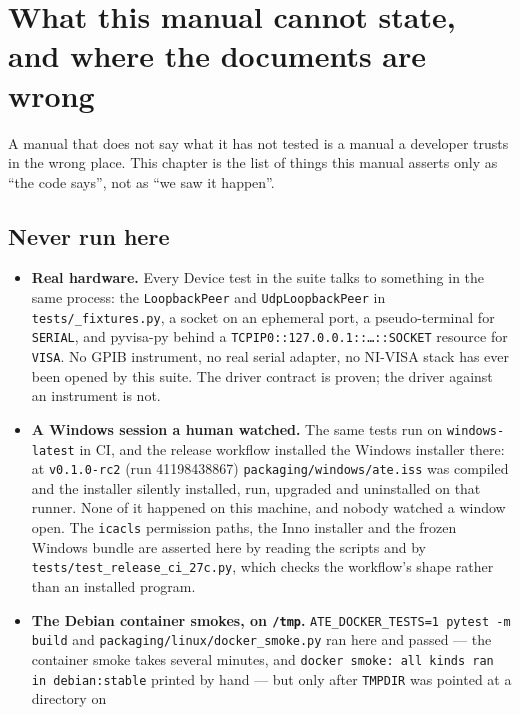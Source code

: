 \chapter{What this manual cannot state, and where the documents are wrong}\label{ch:unproven}

A manual that does not say what it has not tested is a manual a developer trusts in the wrong place.
This chapter is the list of things this manual asserts only as ``the code says'', not as ``we saw it
happen''.

\section{Never run here}

\begin{itemize}
  \item \textbf{Real hardware.} Every Device test in the suite talks to something in the same
    process: the \texttt{LoopbackPeer} and \texttt{UdpLoopbackPeer} in \texttt{tests/\_fixtures.py},
    a socket on an ephemeral port, a pseudo-terminal for \texttt{SERIAL}, and pyvisa-py behind a
    \texttt{TCPIP0::127.0.0.1::\dots::SOCKET} resource for \texttt{VISA}. No GPIB instrument, no real
    serial adapter, no NI-VISA stack has ever been opened by this suite. The driver contract is
    proven; the driver against an instrument is not.
  \item \textbf{A Windows session a human watched.} The same tests run on \texttt{windows-latest} in
    CI, and the release workflow installed the Windows installer there: at \texttt{v0.1.0-rc2} (run
    41198438867) \texttt{packaging/\allowbreak{}windows/\allowbreak{}ate.iss} was compiled and the installer
    silently installed, run, upgraded and uninstalled on that runner. None of it happened on this
    machine, and nobody watched a window open. The \texttt{icacls} permission paths, the Inno installer
    and the frozen Windows bundle are asserted here by reading the scripts and by
    \texttt{tests/\allowbreak{}test\_\allowbreak{}release\_\allowbreak{}ci\_\allowbreak27c.py}, which checks the
    workflow's shape rather than an installed program.
  \item \textbf{The Debian container smokes, on \texttt{/tmp}.}
    \texttt{ATE\_\allowbreak{}DOCKER\_\allowbreak{}TESTS=1 pytest -m build} and \texttt{packaging/\allowbreak{}linux/\allowbreak{}docker\_\allowbreak{}smoke.py}
    ran here and passed --- the container smoke takes several minutes, and \texttt{docker smoke: all kinds
    ran in debian:stable} printed by hand --- but only after \texttt{TMPDIR} was pointed at a directory on

\end{itemize}
